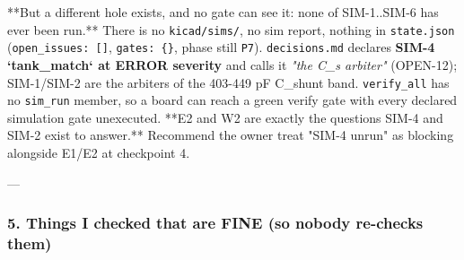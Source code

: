 \documentclass[11pt,a4paper]{article}
\begin{document}
{*}{*}But a different hole exists, and no gate can see it: none of SIM-1..SIM-6 has ever been run.{*}{*} There is no \texttt{kicad/sims/}, no sim report, nothing in \texttt{state.json} (\texttt{open\_issues: {[}{]}}, \texttt{gates: \{\}}, phase still \texttt{P7}). \texttt{decisions.md} declares \textbf{SIM-4 `tank\_match` at ERROR severity} and calls it \emph{"the C\_s arbiter"} (OPEN-12); SIM-1/SIM-2 are the arbiters of the 403-449 pF C\_shunt band. \texttt{verify\_all} has no \texttt{sim\_run} member, so a board can reach a green verify gate with every declared simulation gate unexecuted. {*}{*}E2 and W2 are exactly the questions SIM-4 and SIM-2 exist to answer.{*}{*} Recommend the owner treat "SIM-4 unrun" as blocking alongside E1/E2 at checkpoint 4.

---

\subsubsection*{5. Things I checked that are FINE (so nobody re-checks them)}
\end{document}
